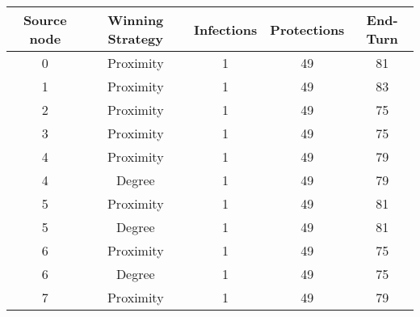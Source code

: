 \documentclass[results.tex]{subfiles}
\begin{document}
    \begin{center}
        \begin{tabular}{| c || c | c | c | c |}
            \hline
            {\bfseries Source node} & {\bfseries Winning Strategy} & {\bfseries Infections} & {\bfseries Protections}
            & {\bfseries End-Turn}
            \\  %
            \hline\hline
            0                       & Proximity                    & 1                      & 49                      & 81                   \\
            \hline
            1                       & Proximity                    & 1                      & 49                      & 83                   \\
            \hline
            2                       & Proximity                    & 1                      & 49                      & 75                   \\
            \hline
            3                       & Proximity                    & 1                      & 49                      & 75                   \\
            \hline
            4                       & Proximity                    & 1                      & 49                      & 79                   \\
            \hline
            4                       & Degree                       & 1                      & 49                      & 79                   \\
            \hline
            5                       & Proximity                    & 1                      & 49                      & 81                   \\
            \hline
            5                       & Degree                       & 1                      & 49                      & 81                   \\
            \hline
            6                       & Proximity                    & 1                      & 49                      & 75                   \\
            \hline
            6                       & Degree                       & 1                      & 49                      & 75                   \\
            \hline
            7                       & Proximity                    & 1                      & 49                      & 79                   \\

\end{tabular}
\end{center}
\end{document}
